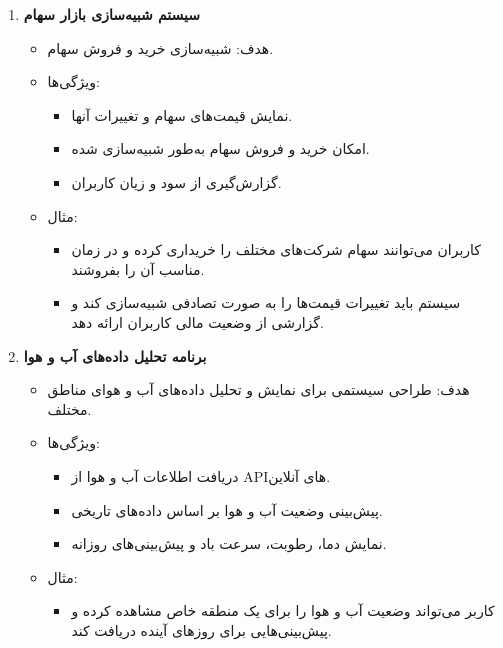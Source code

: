 \documentclass[b5paper,12pt]{article}
\begin{document}
\begin{enumerate}
			\item \textbf{سیستم شبیه‌سازی بازار سهام}
			\begin{itemize}
				\item هدف: شبیه‌سازی خرید و فروش سهام.
				\item ویژگی‌ها:
				\begin{itemize}
					\item نمایش قیمت‌های سهام و تغییرات آنها.
					\item امکان خرید و فروش سهام به‌طور شبیه‌سازی شده.
					\item گزارش‌گیری از سود و زیان کاربران.
				\end{itemize}
				\item مثال:
				\begin{itemize}
					\item کاربران می‌توانند سهام شرکت‌های مختلف را خریداری کرده و در زمان مناسب آن را بفروشند.
					\item سیستم باید تغییرات قیمت‌ها را به صورت تصادفی شبیه‌سازی کند و گزارشی از وضعیت مالی کاربران ارائه دهد.
				\end{itemize}
			\end{itemize}
			
			\item \textbf{برنامه تحلیل داده‌های آب و هوا}
			\begin{itemize}
				\item هدف: طراحی سیستمی برای نمایش و تحلیل داده‌های آب و هوای مناطق مختلف.
				\item ویژگی‌ها:
				\begin{itemize}
					\item دریافت اطلاعات آب و هوا از APIهای آنلاین.
					\item پیش‌بینی وضعیت آب و هوا بر اساس داده‌های تاریخی.
					\item نمایش دما، رطوبت، سرعت باد و پیش‌بینی‌های روزانه.
				\end{itemize}
				\item مثال:
				\begin{itemize}
					\item کاربر می‌تواند وضعیت آب و هوا را برای یک منطقه خاص مشاهده کرده و پیش‌بینی‌هایی برای روزهای آینده دریافت کند.
				\end{itemize}
			\end{itemize}
			

\end{enumerate}
\end{document}
